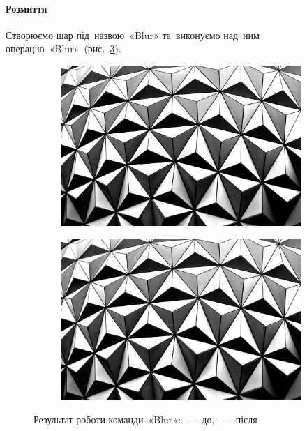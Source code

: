 \documentclass[
	a4paper,
	oneside,
	BCOR = 10mm,
	DIV = 12,
	12pt,
	headings = normal,
]{scrartcl}
\begin{document}
		\paragraph{Розмиття}
			Створюємо шар під~назвою~\textenglish{«Blur»} та~виконуємо над~ним операцію~\textenglish{«Blur»}~(рис.~\ref{fig:04-blur}).
			\begin{figure}[!htbp]
				\centering
				\begin{subfigure}{0.5\columnwidth}
					\centering
					\includegraphics[height = 6\baselineskip]{./assets/abstract-abstract-photo-art-1070345.jpg}
					\caption{}
					\label{subfig:04-01-blur}
				\end{subfigure}%
				\begin{subfigure}{0.5\columnwidth}
					\centering
					\includegraphics[height = 6\baselineskip]{./assets/y03s01-multimedia-lab-01-p01-04-blur.jpg}
					\caption{}
					\label{subfig:04-02-blur}
				\end{subfigure}%
				\caption{Результат роботи команди~\textenglish{«Blur»}: ~— до, ~— після}
				\label{fig:04-blur}
			\end{figure}
\end{document}

